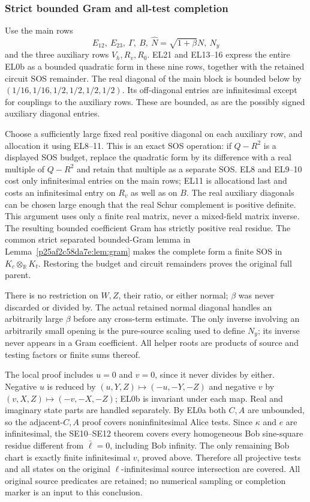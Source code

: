 \subsubsection*{Strict bounded Gram and all-test completion}
Use the main rows
\[
 E_{12},\ E_{23},\ \Gamma,\ B,\ \widehat N=\sqrt{1+\beta}N,
 \ N_y
\]
and the three auxiliary rows $V_h,R_v,R_0$.
EL21 and EL13--16 express the entire EL0b as a bounded quadratic
form in these nine rows, together with the retained circuit SOS
remainder.  The real diagonal of the main block is bounded below
by $(1/16,1/16,1/2,1/2,1/2,1/2)$.
Its off-diagonal entries are infinitesimal except for couplings to
the auxiliary rows.  These are bounded, as are the possibly signed
auxiliary diagonal entries.

Choose a sufficiently large fixed real positive diagonal on each
auxiliary row, and allocation it using EL8--11.  This is an exact
SOS operation: if $Q-R^2$ is a displayed SOS budget, replace the
quadratic form by its difference with a real multiple of $Q-R^2$
and retain that multiple as a separate SOS.  EL8 and EL9--10 cost
only infinitesimal entries on the main rows; EL11 is allocationd
last and costs an infinitesimal entry on $R_v$ as well as on $B$.
The real auxiliary diagonals can be chosen large enough that the
real Schur complement is positive definite.  This argument uses
only a finite real matrix, never a mixed-field matrix inverse.
The resulting bounded coefficient Gram has strictly positive real
residue.  The common strict separated bounded-Gram lemma in
Lemma~\ref{p25af2c58da7e:lem:gram} makes the complete form a finite
SOS in $K_c\otimes_{\mathbb R}K_t$.  Restoring the budget and circuit
remainders proves the original full parent.

There is no restriction on $W,Z$, their ratio, or either normal;
$\beta$ was never discarded or divided by.  The actual retained
normal diagonal handles an arbitrarily large $\beta$ before any
cross-term estimate.  The only inverse involving an arbitrarily
small opening is the pure-source scaling used to define $N_y$;
its inverse never appears in a Gram coefficient.  All helper roots
are products of source and testing factors or finite sums thereof.

The local proof includes $u=0$ and $v=0$, since it never divides
by either.  Negative $u$ is reduced by
$(u,Y,Z)\mapsto(-u,-Y,-Z)$ and negative $v$ by
$(v,X,Z)\mapsto(-v,-X,-Z)$; EL0b is invariant under each map.
Real and imaginary state parts are handled separately.
By EL0a both $C,A$ are unbounded, so the adjacent-$C,A$
proof covers noninfinitesimal Alice tests.  Since $\kappa$ and $e$
are infinitesimal, the SE10--SE12 theorem covers every
homogeneous Bob sine-square residue different from $\bar\ell=0$,
including Bob infinity.  The only remaining Bob chart is exactly
finite infinitesimal $v$, proved above.  Therefore all projective
tests and all states on the original $\ell$-infinitesimal source
intersection are covered.  All original source predicates are
retained; no numerical sampling or completion marker
is an input to this conclusion.



